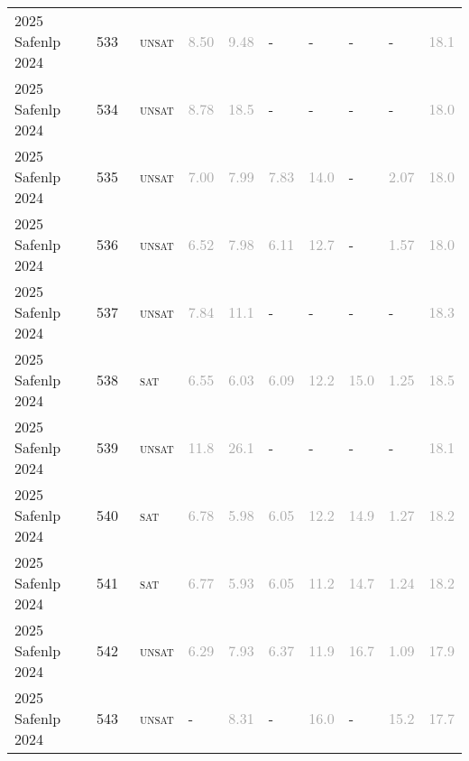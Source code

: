 \begin{center}
{\begin{longtable}{@{}llllllllll@{}}
2025 Safenlp 2024 & 533 & ~\textsc{unsat} & \textcolor{darkgray}{8.50} & \textcolor{darkgray}{9.48} & - & - & - & - & \textcolor{darkgray}{18.1} \\
2025 Safenlp 2024 & 534 & ~\textsc{unsat} & \textcolor{darkgray}{8.78} & \textcolor{darkgray}{18.5} & - & - & - & - & \textcolor{darkgray}{18.0} \\
2025 Safenlp 2024 & 535 & ~\textsc{unsat} & \textcolor{darkgray}{7.00} & \textcolor{darkgray}{7.99} & \textcolor{darkgray}{7.83} & \textcolor{darkgray}{14.0} & - & \textcolor{darkgray}{2.07} & \textcolor{darkgray}{18.0} \\
2025 Safenlp 2024 & 536 & ~\textsc{unsat} & \textcolor{darkgray}{6.52} & \textcolor{darkgray}{7.98} & \textcolor{darkgray}{6.11} & \textcolor{darkgray}{12.7} & - & \textcolor{darkgray}{1.57} & \textcolor{darkgray}{18.0} \\
2025 Safenlp 2024 & 537 & ~\textsc{unsat} & \textcolor{darkgray}{7.84} & \textcolor{darkgray}{11.1} & - & - & - & - & \textcolor{darkgray}{18.3} \\
2025 Safenlp 2024 & 538 & ~\textsc{sat} & \textcolor{darkgray}{6.55} & \textcolor{darkgray}{6.03} & \textcolor{darkgray}{6.09} & \textcolor{darkgray}{12.2} & \textcolor{darkgray}{15.0} & \textcolor{darkgray}{1.25} & \textcolor{darkgray}{18.5} \\
2025 Safenlp 2024 & 539 & ~\textsc{unsat} & \textcolor{darkgray}{11.8} & \textcolor{darkgray}{26.1} & - & - & - & - & \textcolor{darkgray}{18.1} \\
2025 Safenlp 2024 & 540 & ~\textsc{sat} & \textcolor{darkgray}{6.78} & \textcolor{darkgray}{5.98} & \textcolor{darkgray}{6.05} & \textcolor{darkgray}{12.2} & \textcolor{darkgray}{14.9} & \textcolor{darkgray}{1.27} & \textcolor{darkgray}{18.2} \\
2025 Safenlp 2024 & 541 & ~\textsc{sat} & \textcolor{darkgray}{6.77} & \textcolor{darkgray}{5.93} & \textcolor{darkgray}{6.05} & \textcolor{darkgray}{11.2} & \textcolor{darkgray}{14.7} & \textcolor{darkgray}{1.24} & \textcolor{darkgray}{18.2} \\
2025 Safenlp 2024 & 542 & ~\textsc{unsat} & \textcolor{darkgray}{6.29} & \textcolor{darkgray}{7.93} & \textcolor{darkgray}{6.37} & \textcolor{darkgray}{11.9} & \textcolor{darkgray}{16.7} & \textcolor{darkgray}{1.09} & \textcolor{darkgray}{17.9} \\
2025 Safenlp 2024 & 543 & ~\textsc{unsat} & - & \textcolor{darkgray}{8.31} & - & \textcolor{darkgray}{16.0} & - & \textcolor{darkgray}{15.2} & \textcolor{darkgray}{17.7} \\

\end{longtable}}
\end{center}
